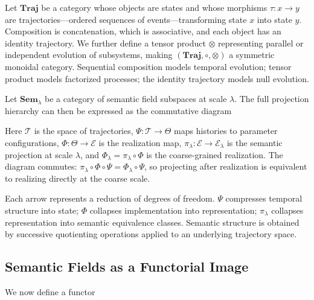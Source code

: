 \documentclass[11pt, twoside]{article}
\theoremstyle{plain}
\theoremstyle{definition}
\theoremstyle{remark}
\begin{document}
Let $\mathbf{Traj}$ be a category whose objects are states and whose morphisms $\tau : x \to y$ are trajectories---ordered sequences of events---transforming state $x$ into state $y$. Composition is concatenation, which is associative, and each object has an identity trajectory. We further define a tensor product $\otimes$ representing parallel or independent evolution of subsystems, making $(\mathbf{Traj}, \circ, \otimes)$ a symmetric monoidal category. Sequential composition models temporal evolution; tensor product models factorized processes; the identity trajectory models null evolution.

Let $\mathbf{Sem}_\lambda$ be a category of semantic field subspaces at scale $\lambda$. The full projection hierarchy can then be expressed as the commutative diagram

\begin{center}
\end{center}

Here $\mathcal{T}$ is the space of trajectories, $\Psi : \mathcal{T} \to \Theta$ maps histories to parameter configurations, $\Phi : \Theta \to \mathcal{E}$ is the realization map, $\pi_\lambda : \mathcal{E} \to \mathcal{E}_\lambda$ is the semantic projection at scale $\lambda$, and $\Phi_\lambda = \pi_\lambda \circ \Phi$ is the coarse-grained realization. The diagram commutes: $\pi_\lambda \circ \Phi \circ \Psi = \Phi_\lambda \circ \Psi$, so projecting after realization is equivalent to realizing directly at the coarse scale.

Each arrow represents a reduction of degrees of freedom. $\Psi$ compresses temporal structure into state; $\Phi$ collapses implementation into representation; $\pi_\lambda$ collapses representation into semantic equivalence classes. Semantic structure is obtained by successive quotienting operations applied to an underlying trajectory space.

\subsection{Semantic Fields as a Functorial Image}

We now define a functor
\end{document}

